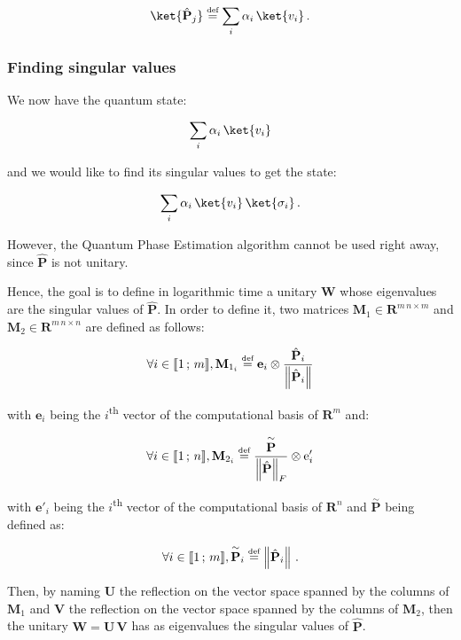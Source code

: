 \documentclass[11pt, a4paper]{article}
\begin{document}
                \[\ket{\hat{\mathbf{P}}_j} \overset{\text{\tiny{def}}}{=} \sum_{i}\alpha_i\,\ket{v_i}\,.\]
                
            \subsubsection{Finding singular values}
                We now have the quantum state:
                
                \[\sum_{i}\alpha_i\,\ket{v_i}\]
                
                and we would like to find its singular values to get the state:
                
                \[\sum_{i}\alpha_i\,\ket{v_i}\,\ket{\sigma_i}\,.\]
                
                However, the Quantum Phase Estimation algorithm cannot be used right away, since \(\hat{\mathbf{P}}\) is not unitary.
                
                Hence, the goal is to define in logarithmic time a unitary \(\mathbf{W}\) whose eigenvalues are the singular values of \(\hat{\mathbf{P}}\). In order to define it, two matrices \(\mathbf{M}_1\in\mathbf{R}^{m\,n\times m}\) and \(\mathbf{M}_2\in\mathbf{R}^{m\,n\times n}\) are defined as follows:
                
                \[\forall i\in\llbracket1\,;\,m\rrbracket,\mathbf{M}_{1_i}\overset{\text{\tiny{def}}}{=}\mathbf{e}_i\otimes\frac{\hat{\mathbf{P}}_i}{\left\|\hat{\mathbf{P}}_i\right\|}\]
                
                with \(\mathbf{e}_i\) being the \(i\)\textsuperscript{th} vector of the computational basis of \(\mathbf{R}^{m}\) and:
                
                \[\forall i\in\llbracket1\,;\,n\rrbracket,\mathbf{M}_{2_i}\overset{\text{\tiny{def}}}{=}\frac{\overset{\sim}{\mathbf{P}}}{\left\|\hat{\mathbf{P}}\right\|_F}\otimes\mathrm{e}'_i\]
                
                with \(\mathbf{e}'_i\) being the \(i\)\textsuperscript{th} vector of the computational basis of \(\mathbf{R}^{n}\) and \(\overset{\sim}{\mathbf{P}}\) being defined as:
                
                \[\forall i\in\llbracket1\,;\,m\rrbracket,\overset{\sim}{\mathbf{P}}_i\overset{\text{\tiny{def}}}{=}\left\|\hat{\mathbf{P}}_i\right\|\,.\]
                
                Then, by naming \(\mathbf{U}\) the reflection on the vector space spanned by the columns of \(\mathbf{M}_1\) and \(\mathbf{V}\) the reflection on the vector space spanned by the columns of \(\mathbf{M}_2\), then the unitary \(\mathbf{W} = \mathbf{U}\,\mathbf{V}\) has as eigenvalues the singular values of \(\hat{\mathbf{P}}\).
                
\end{document}
